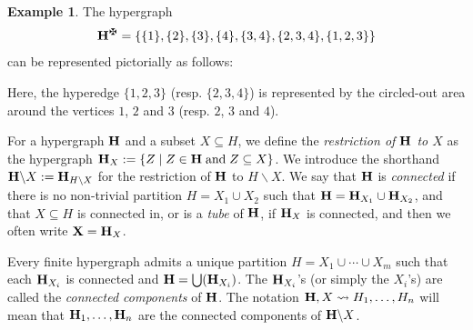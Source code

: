 \documentclass{article}
\theoremstyle{plain}
\theoremstyle{definition}
\newtheorem{example}[thm]{\sc Example}
\newcommand{\inc}{\subseteq}
\newcommand{\union}{\cup}
\newcommand{\Union}{\bigcup}
\newcommand{\set}[1]{\{#1\}}
\newcommand{\setc}[2]{\set{#1 \mid #2}}
\newcommand{\hyper}[1]{{\bf #1}}
\newcommand{\restrH}[2]{\hyper{#1}\backslash #2}
\begin{document}
\begin{example}\label{hypergraphex1} The hypergraph 
 $${\bf H}^\maltese=\{\{1\},\{2\},\{3\},\{4\},\{3,4\},\{2,3,4\},\{1,2,3\}\}$$ can be represented pictorially as follows:
\begin{center}
\end{center}
Here, the hyperedge $\{1,2,3\}$ (resp. $\{2,3,4\}$) is represented by the circled-out area around the vertices $1$, $2$ and $3$ (resp. $2$, $3$ and $4$). 
 \end{example}
 
For a hypergraph $\hyper{H}$ and a subset $X\inc H$, we define the {\em restriction of ${\bf H}$ to $X$} as the hypergraph
$\hyper{H}_X:=\setc{Z}{Z\in \hyper{H}\;\mbox{and}\; Z\inc X}$. We introduce the shorthand $\restrH{H}{X}:=\hyper{H}_{H\backslash X}$ for the restriction of ${\bf H}$ to $H\backslash X$.
We say that $\hyper{H}$ is {\em connected} if there is no non-trivial partition $H=X_1\union X_2$ such that $\hyper{H}=\hyper{H}_{X_1}\union \hyper{H}_{X_2}$, and that $X\inc H$ is connected in, or is a {\em tube} of $\hyper{H}$, if $\hyper{H}_X$ is connected, and then we often write $\hyper{X}=\hyper{H}_X$.
 
\smallskip


Every finite hypergraph admits a unique partition
$H=X_1\union\cdots\union X_m$ such that each $\hyper{H}_{X_i}$ is connected and $\hyper{H}=\Union(\hyper{H}_{X_i})$. The $\hyper{H}_{X_i}$'s (or simply the $X_i$'s) are called the {\em connected components} of $\hyper{H}$. The notation
$\hyper{H},X \leadsto H_1,\ldots, H_n$
 will mean that $\hyper{H}_1,\ldots,\hyper{H}_n$ are the
 connected components of $\restrH{H}{X}$. 
 
\end{document}
